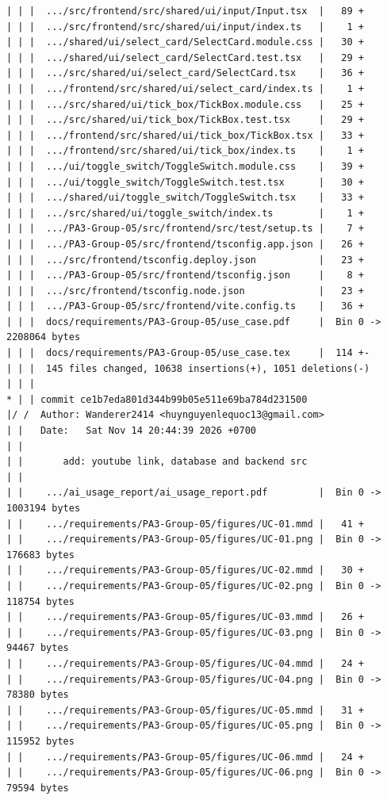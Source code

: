 \documentclass[12pt]{article}
\begin{document}
\begin{lstlisting}[numbers=none,breaklines=true]
| | |  .../src/frontend/src/shared/ui/input/Input.tsx  |   89 +
| | |  .../src/frontend/src/shared/ui/input/index.ts   |    1 +
| | |  .../shared/ui/select_card/SelectCard.module.css |   30 +
| | |  .../shared/ui/select_card/SelectCard.test.tsx   |   29 +
| | |  .../src/shared/ui/select_card/SelectCard.tsx    |   36 +
| | |  .../frontend/src/shared/ui/select_card/index.ts |    1 +
| | |  .../src/shared/ui/tick_box/TickBox.module.css   |   25 +
| | |  .../src/shared/ui/tick_box/TickBox.test.tsx     |   29 +
| | |  .../frontend/src/shared/ui/tick_box/TickBox.tsx |   33 +
| | |  .../frontend/src/shared/ui/tick_box/index.ts    |    1 +
| | |  .../ui/toggle_switch/ToggleSwitch.module.css    |   39 +
| | |  .../ui/toggle_switch/ToggleSwitch.test.tsx      |   30 +
| | |  .../shared/ui/toggle_switch/ToggleSwitch.tsx    |   33 +
| | |  .../src/shared/ui/toggle_switch/index.ts        |    1 +
| | |  .../PA3-Group-05/src/frontend/src/test/setup.ts |    7 +
| | |  .../PA3-Group-05/src/frontend/tsconfig.app.json |   26 +
| | |  .../src/frontend/tsconfig.deploy.json           |   23 +
| | |  .../PA3-Group-05/src/frontend/tsconfig.json     |    8 +
| | |  .../src/frontend/tsconfig.node.json             |   23 +
| | |  .../PA3-Group-05/src/frontend/vite.config.ts    |   36 +
| | |  docs/requirements/PA3-Group-05/use_case.pdf     |  Bin 0 -> 2208064 bytes
| | |  docs/requirements/PA3-Group-05/use_case.tex     |  114 +-
| | |  145 files changed, 10638 insertions(+), 1051 deletions(-)
| | |
* | | commit ce1b7eda801d344b99b05e511e69ba784d231500
|/ /  Author: Wanderer2414 <huynguyenlequoc13@gmail.com>
| |   Date:   Sat Nov 14 20:44:39 2026 +0700
| |
| |       add: youtube link, database and backend src
| |
| |    .../ai_usage_report/ai_usage_report.pdf         |  Bin 0 -> 1003194 bytes
| |    .../requirements/PA3-Group-05/figures/UC-01.mmd |   41 +
| |    .../requirements/PA3-Group-05/figures/UC-01.png |  Bin 0 -> 176683 bytes
| |    .../requirements/PA3-Group-05/figures/UC-02.mmd |   30 +
| |    .../requirements/PA3-Group-05/figures/UC-02.png |  Bin 0 -> 118754 bytes
| |    .../requirements/PA3-Group-05/figures/UC-03.mmd |   26 +
| |    .../requirements/PA3-Group-05/figures/UC-03.png |  Bin 0 -> 94467 bytes
| |    .../requirements/PA3-Group-05/figures/UC-04.mmd |   24 +
| |    .../requirements/PA3-Group-05/figures/UC-04.png |  Bin 0 -> 78380 bytes
| |    .../requirements/PA3-Group-05/figures/UC-05.mmd |   31 +
| |    .../requirements/PA3-Group-05/figures/UC-05.png |  Bin 0 -> 115952 bytes
| |    .../requirements/PA3-Group-05/figures/UC-06.mmd |   24 +
| |    .../requirements/PA3-Group-05/figures/UC-06.png |  Bin 0 -> 79594 bytes

\end{lstlisting}
\end{document}
